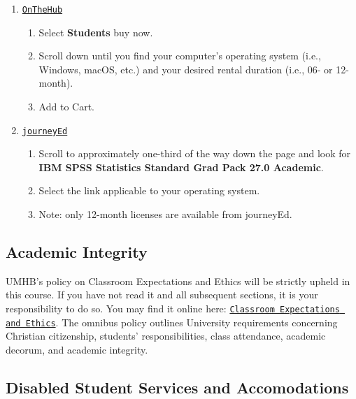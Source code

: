 \documentclass[
]{article}
\providecommand{\tightlist}{%
  \setlength{\itemsep}{0pt}\setlength{\parskip}{0pt}}
\begin{document}
\begin{enumerate}
\def\labelenumi{\arabic{enumi}.}
\tightlist
\item
  \texttt{\href{https://onthehub.com/spss/}{OnTheHub}}

  \begin{enumerate}
  \def\labelenumii{\arabic{enumii}.}
  \tightlist
  \item
    Select \textbf{Students} buy now.
  \item
    Scroll down until you find your computer's operating system (i.e.,
    Windows, macOS, etc.) and your desired rental duration (i.e., 06- or
    12-month).
  \item
    Add to Cart.
  \end{enumerate}
\item
  \texttt{\href{https://www.journeyed.com/products/IBM+SPSS/IBM+SPSS+Statistics}{journeyEd}}

  \begin{enumerate}
  \def\labelenumii{\arabic{enumii}.}
  \tightlist
  \item
    Scroll to approximately one-third of the way down the page and look
    for \textbf{IBM SPSS Statistics Standard Grad Pack 27.0 Academic}.
  \item
    Select the link applicable to your operating system.
  \item
    Note: only 12-month licenses are available from journeyEd.
  \end{enumerate}
\end{enumerate}

\subsection{Academic Integrity}

UMHB's policy on Classroom Expectations and Ethics will be strictly
upheld in this course. If you have not read it and all subsequent
sections, it is your responsibility to do so. You may find it online
here:
\href{http://catalog.umhb.edu/2020-2021/Graduate-Catalog/Classroom-Expectations-and-Ethics}{\texttt{Classroom Expectations and Ethics}}.
The omnibus policy outlines University requirements concerning Christian
citizenship, students' responsibilities, class attendance, academic
decorum, and academic integrity.

\subsection{Disabled Student Services and Accomodations}
\end{document}

